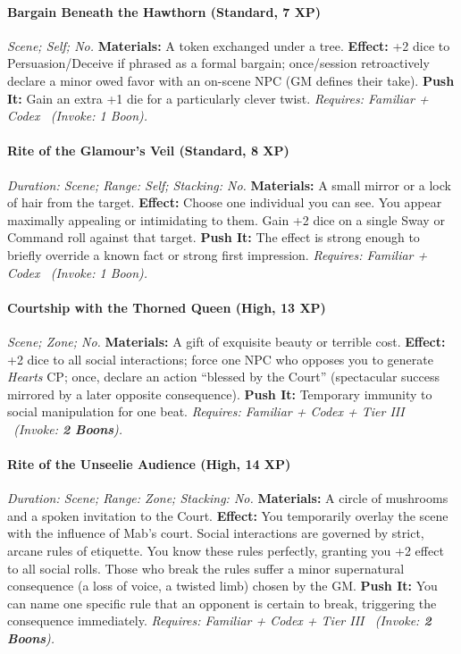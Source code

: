 \documentclass[12pt,twoside]{book}
\begin{document}
\paragraph{Bargain Beneath the Hawthorn (Standard, 7 XP)} \emph{Scene; Self; No.}
\textbf{Materials:} A token exchanged under a tree.
\textbf{Effect:} +2 dice to Persuasion/Deceive if phrased as a formal bargain; once/session retroactively declare a minor owed favor with an on-scene NPC (GM defines their take).
\textbf{Push It:} Gain an extra +1 die for a particularly clever twist.
\emph{Requires: Familiar + Codex \ (\textit{Invoke:} 1 Boon).}
\paragraph{Rite of the Glamour's Veil (Standard, 8 XP)} \emph{Duration: Scene; Range: Self; Stacking: No.}
\textbf{Materials:} A small mirror or a lock of hair from the target.
\textbf{Effect:} Choose one individual you can see. You appear maximally appealing or intimidating to them. Gain +2 dice on a single Sway or Command roll against that target.
\textbf{Push It:} The effect is strong enough to briefly override a known fact or strong first impression.
\emph{Requires: Familiar + Codex \ (\textit{Invoke:} 1 Boon).}
\paragraph{Courtship with the Thorned Queen (High, 13 XP)} \emph{Scene; Zone; No.}
\textbf{Materials:} A gift of exquisite beauty or terrible cost.
\textbf{Effect:} +2 dice to all social interactions; force one NPC who opposes you to generate \emph{Hearts} CP; once, declare an action ``blessed by the Court'' (spectacular success mirrored by a later opposite consequence).
\textbf{Push It:} Temporary immunity to social manipulation for one beat.
\emph{Requires: Familiar + Codex + Tier III \ (\textit{Invoke:} \textbf{2 Boons}).}
\paragraph{Rite of the Unseelie Audience (High, 14 XP)} \emph{Duration: Scene; Range: Zone; Stacking: No.}
\textbf{Materials:} A circle of mushrooms and a spoken invitation to the Court.
\textbf{Effect:} You temporarily overlay the scene with the influence of Mab's court. Social interactions are governed by strict, arcane rules of etiquette. You know these rules perfectly, granting you +2 effect to all social rolls. Those who break the rules suffer a minor supernatural consequence (a loss of voice, a twisted limb) chosen by the GM.
\textbf{Push It:} You can name one specific rule that an opponent is certain to break, triggering the consequence immediately.
\emph{Requires: Familiar + Codex + Tier III \ (\textit{Invoke:} \textbf{2 Boons}).}
\end{document}
